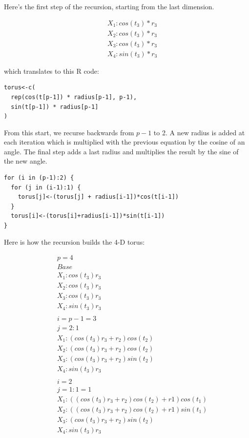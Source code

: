 \documentclass[article]{jss}
\begin{document}
Here's the first step of the recursion, starting from the last
dimension.

\begin{eqnarray*}
&&X_1: cos(t_3)*r_3\\
&&X_2: cos(t_3)*r_3\\
&&X_3: cos(t_3)*r_3\\
&&X_4: sin(t_3)*r_3
\end{eqnarray*}

\noindent which translates to this R code:

\begin{verbatim}
torus<-c(
  rep(cos(t[p-1]) * radius[p-1], p-1), 
  sin(t[p-1]) * radius[p-1]
)
\end{verbatim}

From this start, we recurse backwards from $p-1$ to 2. A new radius is
added at each iteration which is multiplied with the previous equation
by the cosine of an angle. The final step adds a last radius and
multiplies the result by the sine of the new angle. 

\begin{verbatim}
for (i in (p-1):2) {
  for (j in (i-1):1) {
    torus[j]<-(torus[j] + radius[i-1])*cos(t[i-1])
  }
  torus[i]<-(torus[i]+radius[i-1])*sin(t[i-1])
}
\end{verbatim}

Here is how the recursion builds the 4-D torus:

\begin{eqnarray*}
&&p=4\\
&&Base\\
&&X_1: cos(t_3)r_3\\
&&X_2: cos(t_3)r_3\\
&&X_3: cos(t_3)r_3\\
&&X_4: sin(t_3)r_3\\
\\
&&i=p-1=3\\
&&j=2:1\\
&&X_1: (cos(t_3)r_3 + r_2)cos(t_2)\\
&&X_2: (cos(t_3)r_3 + r_2)cos(t_2)\\
&&X_3: (cos(t_3)r_3 + r_2)sin(t_2)\\
&&X_4: sin(t_3)r_3\\
\\
&&i=2\\
&&j=1:1=1\\
&&X_1: ((cos(t_3)r_3 + r_2)cos(t_2) + r1)cos(t_1)\\
&&X_2: ((cos(t_3)r_3 + r_2)cos(t_2) + r1)sin(t_1)\\
&&X_3: (cos(t_3)r_3 + r_2)sin(t_2)\\
&&X_4: sin(t_3)r_3\\
\end{eqnarray*}
\end{document}
